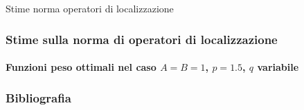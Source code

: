 \documentclass[aspectratio=141]{beamer}
\begin{document}
\begin{section}{Stime norma operatori di localizzazione}
	\begin{frame}
		\frametitle{Stime sulla norma di operatori di localizzazione}
		\framesubtitle{Funzioni peso ottimali nel caso $A=B=1$, $p=1.5$, $q$ variabile}
		\vspace{-1.1cm}
		\begin{center}
			\vspace{1cm}
		\end{center}
	\end{frame}
	
\end{section}

\begin{frame}
	\frametitle{Bibliografia}
	\vspace{-0.8cm}
	{\tiny
	\nocite{*}
	\printbibliography}
\end{frame}

\end{document}
